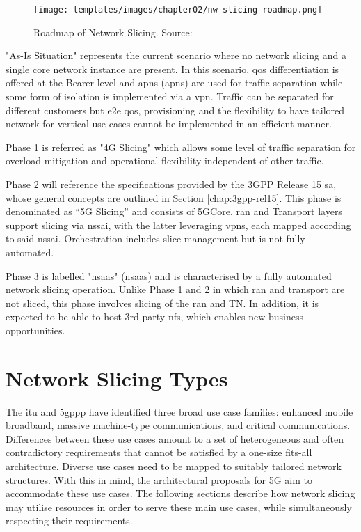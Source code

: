 \begin{figure}[!ht]
    \centering
    \texttt{[image: templates/images/chapter02/nw-slicing-roadmap.png]}
    \caption{Roadmap of Network Slicing. Source: \cite{4G_LTE_E2E-NS}}
    \label{fig:nw-slicing-roadmap}
\end{figure}

"As-Is Situation" represents the current scenario where no network slicing and a single core network instance are present. In this scenario, \acrshort{qos} differentiation is offered at the Bearer level and \acrlong{apn}s (\acrshort{apn}s) are used for traffic separation while some form of isolation is implemented via a \acrfull{vpn}. Traffic can be separated for different customers but \acrshort{e2e} \acrfull{qos}, provisioning and the flexibility to have tailored network for vertical use cases cannot be implemented in an efficient manner.

Phase 1 is referred as  "4G Slicing" which  allows some level of traffic separation for overload mitigation and operational flexibility independent of other traffic.

Phase 2 will reference the specifications provided by the 3GPP Release 15 \acrfull{sa}, whose general concepts are outlined in Section \ref{chap:3gpp-rel15}. This phase is denominated as “5G Slicing” and consists of 5GCore. \acrshort{ran} and Transport layers support slicing via \acrfull{nssai}, with the latter leveraging \acrshort{vpn}s, each mapped according to said \acrshort{nssai}. Orchestration includes slice management but is not fully automated.

Phase 3 is labelled "\acrlong{nsaas}" (\acrshort{nsaas}) and is characterised by a fully automated network slicing operation. Unlike Phase 1 and 2 in which \acrshort{ran} and transport are not sliced, this phase involves slicing of the \acrshort{ran} and TN. In addition, it is expected to be able to host 3rd party \acrshort{nf}s, which enables new business opportunities.


\section{Network Slicing Types}

The \acrfull{itu} \cite{m.2083-0-201509} and \acrfull{5gppp} \cite{view_5g_architecture} have identified three broad use case families: enhanced mobile broadband, massive machine-type communications, and critical communications. Differences between these use cases amount to a set of heterogeneous and often contradictory requirements that cannot be satisfied by a one-size fits-all architecture. Diverse use cases need to be mapped to suitably tailored network structures. With this in mind, the architectural proposals for 5G aim to accommodate these use cases. The following sections describe how network slicing may utilise resources in order to serve these main use cases, while simultaneously respecting their requirements.

